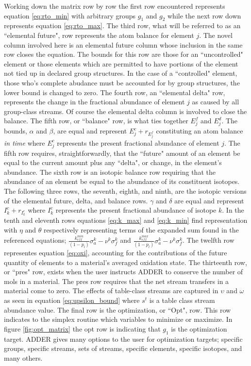 \documentclass[]{elsarticle}
\begin{document}
Working down the matrix row by row the first row encountered represents equation
\ref{eq:rto_min} with arbitrary groups $g_{1}$ and $g_{2}$ while the next row 
down represents equation \ref{eq:rto_max}. The third row, what will be referred
to as an ``elemental future", row represents the atom balance for element $j$.
The novel column involved here is an elemental future column whose inclusion
in the same row closes the equation.  
The bounds for this row are those for an
``uncontrolled" element or those elements which are permitted to have portions
of the element not tied up in declared group structures. In the case of a
``controlled" element, those who's complete abudance must be accounted for by
group structures, the lower bound is changed to zero. 
The fourth row, an ``elemental
delta" row, represents the change in the fractional abundance of element $j$
as caused by all group-class streams. Of course the elemental delta column 
is involved to close the balance. The fifth row, or ``balance" row, is what ties
together $E_{j}^{f}$ and $E_{j}^{d}$. The bounds, $\alpha$ and $\beta$,
are equal and represent $E_{j}^{c} + r_{E_{j}^{f}}$ constituting an atom
balance \textit{in time} where $E_{j}^{c}$ represents the present fractional
abundance of element $j$. The fifth row requires, straightforwardly, that the
``future" amount of an element be equal to the current amount plus any ``delta",
or change, in the element's abundance. The sixth row is an isotopic balance row
requiring that the abundance of an element be equal to the abundance of its
constituent isotopes. 
The following three rows, the seventh, eighth, and ninth,
are the isotopic versions of the elemental future, delta, and balance rows.
$\gamma$ and $\delta$ are
equal and represent $I_{k}^{c} + r_{I_{k}^{c}}$ where $I_{k}^{c}$ represents
the present fractional abundance of isotope $k$. In the tenth and eleventh rows
equations \ref{eq:k_max} and \ref{eq:k_min} find representation with $\eta$
and $\theta$ respectively representing terms of the expanded sum found in the
referenced equations; $\frac{k_{eff}^{min}}{(1-p_{l})} \sigma_{a}^{k} - \nu^{k}
\sigma_{f}^{k}$ and
$\frac{k_{eff}^{max}}{(1-p_{l})} \sigma_{a}^{k} - \nu^{k}
\sigma_{f}^{k}$. 
The twelfth row representes equation \ref{eq:oxi}, accounting for the
contributions of the future quantity of elements to a material's averaged
oxidation state.
The thirteenth row, or ``pres" row, exists
when the user instructs ADDER to conserve the number of mols in a material. The
pres row requires that the net stream transfers in a material come to zero. The
effects of table-class streams are captured in $\upsilon$ and $\omega$ as seen
in equation \ref{eq:upsilon_bound} where $s^{t}$ is a table class stream 
abundance value. The final row is the optimization, or ``Opt", row. This row
indicates to the simplex routine which variables to minimize or maximize. In
figure \ref{fig:opt_matrix} the opt row is indicating that $g_{1}$ is the
optimization target. ADDER gives many options to the user for optimization
targets; specific groups, specific streams, sets of streams, specific elements,
specific isotopes, and many others.
\end{document}

